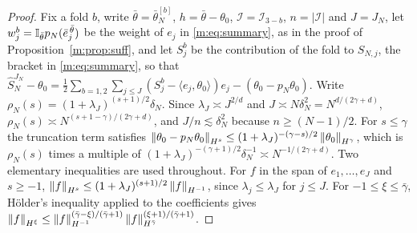 \begin{proof}
Fix a fold $b$, write $\bar\theta=\bar\theta^{[b]}_N$, $h=\bar\theta-\theta_0$, $\mathcal I=\mathcal I_{3-b}$, $n=|\mathcal I|$ and $J=J_N$, let $w^b_j=\mathbb{I}_{\bar\theta}p_N(\bar e_j^{\,\bar\theta})$ be the weight of $e_j$ in \eqref{m:eq:summary}, as in the proof of Proposition~\ref{m:prop:suff}, and let $S^b_j$ be the contribution of the fold to $S_{N,j}$, the bracket in \eqref{m:eq:summary}, so that $\hat S^{J_N}_N-\theta_0=\frac12\sum_{b=1,2}\sum_{j\le J}(S^b_j-\langle e_j,\theta_0\rangle)e_j-(\theta_0-p_N\theta_0)$. Write $\rho_N(s)=(1+\lambda_J)^{(s+1)/2}\delta_N$. Since $\lambda_J\asymp J^{2/d}$ and $J\asymp N\delta_N^2=N^{d/(2\gamma+d)}$, $\rho_N(s)\asymp N^{(s+1-\gamma)/(2\gamma+d)}$, and $J/n\lesssim\delta_N^2$ because $n\ge(N-1)/2$. For $s\le\gamma$ the truncation term satisfies $\left\|\theta_0-p_N\theta_0\right\|_{H^s}\le(1+\lambda_J)^{-(\gamma-s)/2}\left\|\theta_0\right\|_{H^\gamma}$, which is $\rho_N(s)$ times a multiple of $(1+\lambda_J)^{-(\gamma+1)/2}\delta_N^{-1}\asymp N^{-1/(2\gamma+d)}$. Two elementary inequalities are used throughout. For $f$ in the span of $e_1,\dots,e_J$ and $s\ge-1$, $\left\|f\right\|_{H^s}\le(1+\lambda_J)^{(s+1)/2}\left\|f\right\|_{H^{-1}}$, since $\lambda_j\le\lambda_J$ for $j\le J$. For $-1\le\xi\le\bar\gamma$, H\"older's inequality applied to the coefficients gives $\left\|f\right\|_{H^\xi}\le\left\|f\right\|_{H^{-1}}^{(\bar\gamma-\xi)/(\bar\gamma+1)}\left\|f\right\|_{H^{\bar\gamma}}^{(\xi+1)/(\bar\gamma+1)}$.


\end{proof}
